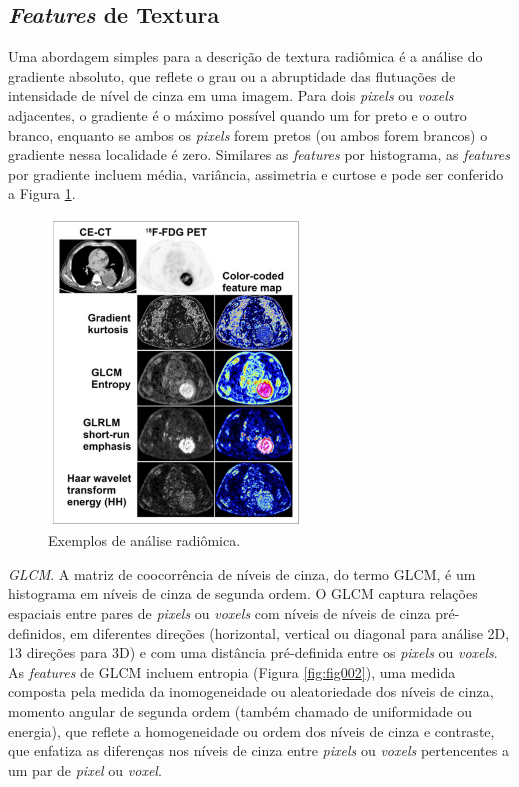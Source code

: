 \subsection{\textit{Features} de Textura}

Uma abordagem simples para a descrição de textura radiômica é a análise do gradiente absoluto, que reflete o grau ou a abruptidade das flutuações de intensidade de nível de cinza em uma imagem. Para dois \textit{pixels} ou \textit{voxels} adjacentes, o gradiente é o máximo possível quando um for preto e o outro branco, enquanto se ambos os \textit{pixels} forem pretos (ou ambos forem brancos) o gradiente nessa localidade é zero. Similares as \textit{features} por histograma, as \textit{features} por gradiente incluem média, variância, assimetria e curtose  e pode ser conferido a Figura \ref{fig:fig001}.

\captionsetup{justification=centering}
\begin{figure}[htbp]
    \centering
    \includegraphics[width=0.6\textwidth]{figures/fig001.png}
    \caption{Exemplos de análise radiômica.}
    \label{fig:fig001}
\end{figure}

 \textit{GLCM}. A matriz de coocorrência de níveis de cinza, do termo \gls{GLCM}, é um histograma em níveis de cinza de segunda ordem. O GLCM captura relações espaciais entre pares de \textit{pixels} ou \textit{voxels} com níveis de níveis de cinza pré-definidos, em diferentes direções (horizontal, vertical ou diagonal para análise 2D, 13 direções para 3D) e com uma distância pré-definida entre os \textit{pixels} ou \textit{voxels}. As \textit{features} de GLCM incluem entropia (Figura \ref{fig:fig002}), uma medida composta pela medida da inomogeneidade ou aleatoriedade dos níveis de cinza, momento angular de segunda ordem (também chamado de uniformidade ou energia), que reflete a homogeneidade ou ordem dos níveis de cinza e contraste, que enfatiza as diferenças nos níveis de cinza entre \textit{pixels} ou \textit{voxels} pertencentes a um par de \textit{pixel} ou \textit{voxel}.

